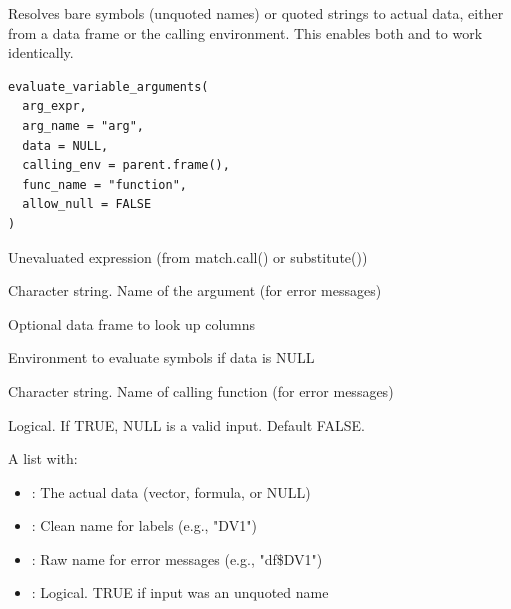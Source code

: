 \documentclass[a4paper]{book}
\begin{document}
%
\begin{Description}
Resolves bare symbols (unquoted names) or quoted strings to actual data,
either from a data frame or the calling environment. This enables both
 and 
to work identically.
\end{Description}
%
\begin{Usage}
\begin{verbatim}
evaluate_variable_arguments(
  arg_expr,
  arg_name = "arg",
  data = NULL,
  calling_env = parent.frame(),
  func_name = "function",
  allow_null = FALSE
)
\end{verbatim}
\end{Usage}
%
\begin{Arguments}
\begin{ldescription}
\item[\code{arg\_expr}] Unevaluated expression (from match.call() or substitute())

\item[\code{arg\_name}] Character string. Name of the argument (for error messages)

\item[\code{data}] Optional data frame to look up columns

\item[\code{calling\_env}] Environment to evaluate symbols if data is NULL

\item[\code{func\_name}] Character string. Name of calling function (for error messages)

\item[\code{allow\_null}] Logical. If TRUE, NULL is a valid input. Default FALSE.
\end{ldescription}
\end{Arguments}
%
\begin{Value}
A list with:
\begin{itemize}

\item{} : The actual data (vector, formula, or NULL)
\item{} : Clean name for labels (e.g., "DV1")
\item{} : Raw name for error messages (e.g., "df\$DV1")
\item{} : Logical. TRUE if input was an unquoted name

\end{itemize}

\end{Value}
\end{document}
